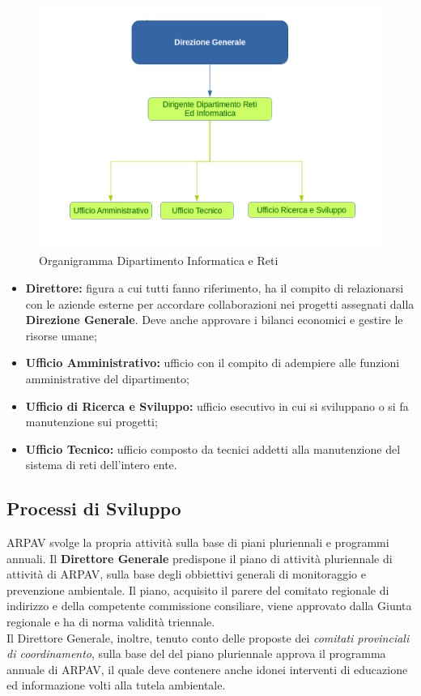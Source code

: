 \begin{figure}[htbp]
	\centering
	\includegraphics[scale=0.4]{./capitoli/capitolo1/img/organigrammaDip}
	\caption{Organigramma Dipartimento Informatica e Reti}
\end{figure}

\begin{itemize}

	\item \textbf{Direttore:} figura a cui tutti fanno riferimento, ha il compito di relazionarsi con le aziende esterne per accordare collaborazioni nei progetti assegnati dalla \textbf{Direzione Generale}. Deve anche approvare i bilanci economici e gestire le risorse umane;
	\item \textbf{Ufficio Amministrativo:} ufficio con il compito di adempiere alle funzioni amministrative del dipartimento;
	\item \textbf{Ufficio di Ricerca e Sviluppo:} ufficio esecutivo in cui si sviluppano o si fa manutenzione sui progetti;
	\item \textbf{Ufficio Tecnico:} ufficio composto da tecnici addetti alla manutenzione del sistema di reti dell'intero ente.
	
\end{itemize}
\subsection{Processi di Sviluppo}

ARPAV svolge la propria attività sulla base di piani pluriennali e programmi annuali. Il \textbf{Direttore Generale} predispone il piano di attività pluriennale di attività di ARPAV, sulla base degli obbiettivi generali di monitoraggio e prevenzione ambientale. Il piano, acquisito il parere del comitato regionale di indirizzo e della competente commissione consiliare, viene approvato dalla Giunta regionale e ha di norma validità triennale. \\
Il Direttore Generale, inoltre, tenuto conto delle proposte dei \textit{comitati provinciali di coordinamento}, sulla base del del piano pluriennale approva il programma annuale di ARPAV, il quale deve contenere anche idonei interventi di educazione ed informazione volti alla tutela ambientale.

